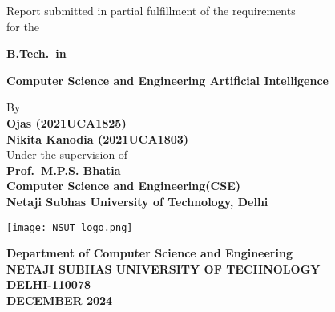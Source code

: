 \begin{titlepage}
    \begin{center}
    \fontsize{18pt}{1cm}\selectfont \textbf{\btptitle}
    
    \vspace*{1.4cm}
    \fontsize{14pt}{21pt}\selectfont Report submitted in partial fulfillment of the requirements\\ for the
    
    \vspace*{0.3cm}
    \fontsize{14pt}{1cm}\selectfont\textbf{B.Tech.\ in} 
    
    \textbf{Computer Science and Engineering Artificial Intelligence}
    
    \vspace*{0.6cm}
    By\\
    \textbf{Ojas (2021UCA1825)\\Nikita Kanodia (2021UCA1803)} \linebreak
    \\Under the supervision of\\
    \textbf{Prof.\ M.P.S. Bhatia\\Computer Science and Engineering(CSE)\\Netaji Subhas University of Technology, Delhi}
    
    \vspace*{0.2cm}
    \texttt{[image: NSUT logo.png]}
    
    \vspace*{0.3cm}
    \fontsize{16pt}{16pt}\selectfont \textbf{Department of Computer Science and Engineering}\\
    \vspace*{0.5cm}
    \fontsize{16pt}{16pt}\selectfont \textbf{NETAJI SUBHAS UNIVERSITY OF TECHNOLOGY\\DELHI-110078}\\
    \vspace*{0.5cm}
    \textbf{DECEMBER 2024}
    \end{center}
    \end{titlepage}